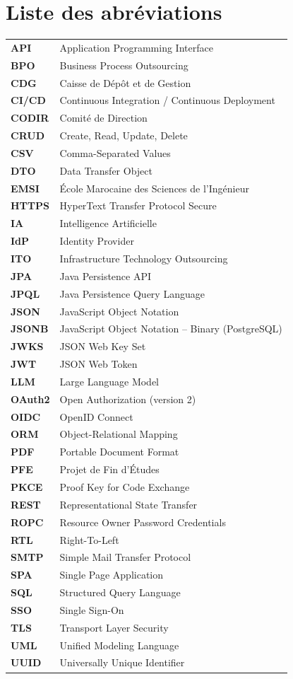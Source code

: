 \documentclass[12pt,a4paper]{report}
\begin{document}
\chapter*{Liste des abréviations}
\begin{longtable}{>{\bfseries}L{3cm}L{11cm}}
API & Application Programming Interface \\
BPO & Business Process Outsourcing \\
CDG & Caisse de Dépôt et de Gestion \\
CI/CD & Continuous Integration / Continuous Deployment \\
CODIR & Comité de Direction \\
CRUD & Create, Read, Update, Delete \\
CSV & Comma-Separated Values \\
DTO & Data Transfer Object \\
EMSI & École Marocaine des Sciences de l'Ingénieur \\
HTTPS & HyperText Transfer Protocol Secure \\
IA & Intelligence Artificielle \\
IdP & Identity Provider \\
ITO & Infrastructure Technology Outsourcing \\
JPA & Java Persistence API \\
JPQL & Java Persistence Query Language \\
JSON & JavaScript Object Notation \\
JSONB & JavaScript Object Notation -- Binary (PostgreSQL) \\
JWKS & JSON Web Key Set \\
JWT & JSON Web Token \\
LLM & Large Language Model \\
OAuth2 & Open Authorization (version 2) \\
OIDC & OpenID Connect \\
ORM & Object-Relational Mapping \\
PDF & Portable Document Format \\
PFE & Projet de Fin d'Études \\
PKCE & Proof Key for Code Exchange \\
REST & Representational State Transfer \\
ROPC & Resource Owner Password Credentials \\
RTL & Right-To-Left \\
SMTP & Simple Mail Transfer Protocol \\
SPA & Single Page Application \\
SQL & Structured Query Language \\
SSO & Single Sign-On \\
TLS & Transport Layer Security \\
UML & Unified Modeling Language \\
UUID & Universally Unique Identifier \\
\end{longtable}
\end{document}

